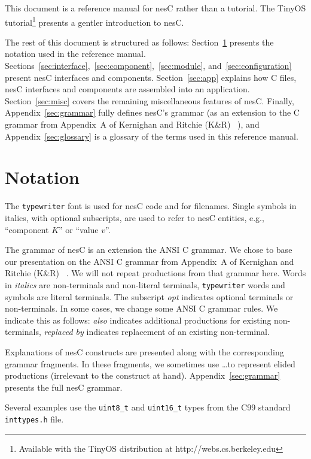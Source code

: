 \documentclass[11pt]{article}
\newcommand{\kw}[1]{{\tt #1}}
\newcommand{\code}[1]{{\tt #1}}
\newcommand{\file}[1]{{\tt #1}}
\newcommand{\nesc}{nesC\xspace}
\begin{document}
This document is a reference manual for \nesc rather than a tutorial. The
TinyOS tutorial\footnote{Available with the TinyOS distribution at
http://webs.cs.berkeley.edu} presents a gentler introduction to \nesc.

The rest of this document is structured as follows:
Section~\ref{sec:notation} presents the notation used in the reference
manual. Sections~\ref{sec:interface},~\ref{sec:component},~\ref{sec:module},
and~\ref{sec:configuration} present \nesc interfaces and
components. Section~\ref{sec:app} explains how C files, \nesc interfaces
and components are assembled into an application. Section~\ref{sec:misc}
covers the remaining miscellaneous features of \nesc. Finally,
Appendix~\ref{sec:grammar} fully defines \nesc's grammar (as an extension to
the C grammar from Appendix~A of Kernighan and Ritchie (K\&R)
~\cite[pp234--239]{kandr}), and Appendix~\ref{sec:glossary} is a glossary
of the terms used in this reference manual.

\section{Notation}
\label{sec:notation}

The \texttt{typewriter} font is used for \nesc code and for
filenames. Single symbols in italics, with optional subscripts, are used to
refer to \nesc entities, e.g., ``component $K$'' or ``value $v$''.

The grammar of \nesc is an extension the ANSI C grammar. We chose to base
our presentation on the ANSI C grammar from Appendix~A of Kernighan and
Ritchie (K\&R) ~\cite[pp234--239]{kandr}. We will not repeat productions
from that grammar here. Words in \emph{italics} are non-terminals and
non-literal terminals, \kw{typewriter} words and symbols are literal
terminals. The subscript \emph{opt} indicates optional terminals or
non-terminals. In some cases, we change some ANSI C grammar rules. We
indicate this as follows: \emph{also} indicates additional productions for
existing non-terminals, \emph{replaced by} indicates replacement of an
existing non-terminal. 

Explanations of \nesc constructs are presented along with the corresponding
grammar fragments. In these fragments, we sometimes use \ldots to represent
elided productions (irrelevant to the construct at
hand). Appendix~\ref{sec:grammar} presents the full \nesc grammar.

Several examples use the \code{uint8\_t} and \code{uint16\_t} types from
the C99 standard \file{inttypes.h} file.
\end{document}
